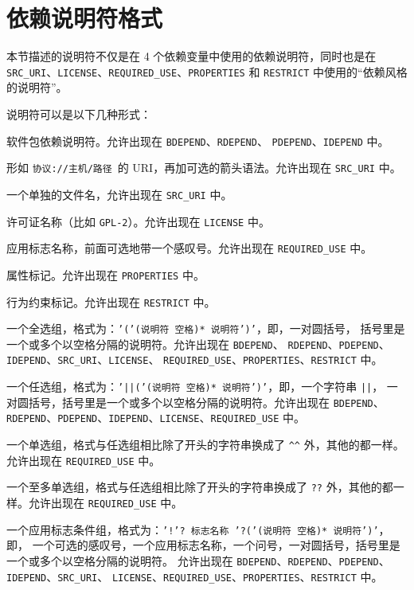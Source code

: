 \section{依赖说明符格式}
\label{sec:dependency-spec}

本节描述的说明符不仅是在 4 个依赖变量中使用的依赖说明符，同时也是在
\texttt{SRC_URI}、\texttt{LICENSE}、\texttt{REQUIRED_USE}、\texttt{PROPERTIES} 和
\texttt{RESTRICT} 中使用的“依赖风格的说明符”。

说明符可以是以下几种形式：

\begin{compactitem}
\item 软件包依赖说明符。允许出现在 \texttt{BDEPEND}、\texttt{RDEPEND}、
    \texttt{PDEPEND}、\texttt{IDEPEND} 中。
\item 形如 \texttt{协议://主机/路径}\ 的 URI，再加可选的箭头语法。允许出现在 \texttt{SRC_URI} 中。
\item 一个单独的文件名，允许出现在 \texttt{SRC_URI} 中。
\item 许可证名称（比如 \texttt{GPL-2}）。允许出现在 \texttt{LICENSE} 中。
\item 应用标志名称，前面可选地带一个感叹号。允许出现在 \texttt{REQUIRED_USE} 中。
\item 属性标记。允许出现在 \texttt{PROPERTIES} 中。
\item 行为约束标记。允许出现在 \texttt{RESTRICT} 中。
\item 一个全选组，格式为：\texttt{'('(说明符\ 空格)* 说明符')'}，即，一对圆括号，
    括号里是一个或多个以空格分隔的说明符。允许出现在 \texttt{BDEPEND}、
    \texttt{RDEPEND}、\texttt{PDEPEND}、\texttt{IDEPEND}、\texttt{SRC_URI}、\texttt{LICENSE}、
    \texttt{REQUIRED_USE}、\texttt{PROPERTIES}、\texttt{RESTRICT} 中。
\item 一个任选组，格式为：\texttt{'||('(说明符\ 空格)* 说明符')'}，即，一个字符串 \texttt{||}，
    一对圆括号，括号里是一个或多个以空格分隔的说明符。允许出现在 \texttt{BDEPEND}、
    \texttt{RDEPEND}、\texttt{PDEPEND}、\texttt{IDEPEND}、\texttt{LICENSE}、\texttt{REQUIRED_USE} 中。
\item 一个单选组，格式与任选组相比除了开头的字符串换成了
    \texttt{\textasciicircum\textasciicircum} 外，其他的都一样。允许出现在 \texttt{REQUIRED_USE} 中。
\item 一个至多单选组，格式与任选组相比除了开头的字符串换成了
    \texttt{??} 外，其他的都一样。允许出现在 \texttt{REQUIRED_USE} 中。
\item 一个应用标志条件组，格式为：\texttt{'!'?\ 标志名称\ '?('(说明符\ 空格)* 说明符')'}，即，
    一个可选的感叹号，一个应用标志名称，一个问号，一对圆括号，括号里是一个或多个以空格分隔的说明符。
    允许出现在 \texttt{BDEPEND}、\texttt{RDEPEND}、\texttt{PDEPEND}、\texttt{IDEPEND}、\texttt{SRC_URI}、
    \texttt{LICENSE}、\texttt{REQUIRED_USE}、\texttt{PROPERTIES}、\texttt{RESTRICT} 中。
\end{compactitem}


